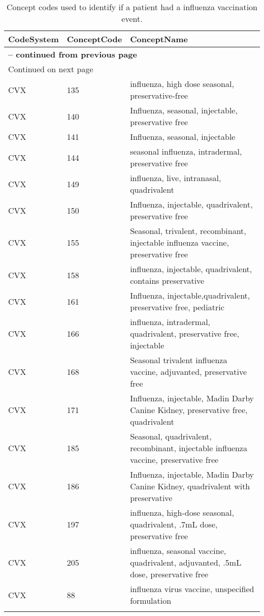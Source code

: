 \begin{longtable}{p{}p{}p{}}
\caption{Concept codes used to identify if a patient had a influenza vaccination event.} \\ 
 CodeSystem & ConceptCode & ConceptName \\ 
  \hline 
\endfirsthead 
\multicolumn{3}{p{\textwidth}}{{ \bfseries \tablename \thetable{} -- continued from previous page}} \ 
\hline CodeSystem & ConceptCode & ConceptName \\ \hline 
\endhead 
\hline \multicolumn{3}{p{\textwidth}}{{Continued on next page}} \\ \hline 
\endfoot 
\hline 
\endlastfoot 
 \hline
CVX & 135 & influenza, high dose seasonal, preservative-free \\ 
  CVX & 140 & Influenza, seasonal, injectable, preservative free \\ 
  CVX & 141 & Influenza, seasonal, injectable \\ 
  CVX & 144 & seasonal influenza, intradermal, preservative free \\ 
  CVX & 149 & influenza, live, intranasal, quadrivalent \\ 
  CVX & 150 & Influenza, injectable, quadrivalent, preservative free \\ 
  CVX & 155 & Seasonal, trivalent, recombinant, injectable influenza vaccine, preservative free \\ 
  CVX & 158 & influenza, injectable, quadrivalent, contains preservative \\ 
  CVX & 161 & Influenza, injectable,quadrivalent, preservative free, pediatric \\ 
  CVX & 166 & influenza, intradermal, quadrivalent, preservative free, injectable \\ 
  CVX & 168 & Seasonal trivalent influenza vaccine, adjuvanted, preservative free \\ 
  CVX & 171 & Influenza, injectable, Madin Darby Canine Kidney, preservative free, quadrivalent \\ 
  CVX & 185 & Seasonal, quadrivalent, recombinant, injectable influenza vaccine, preservative free \\ 
  CVX & 186 & Influenza, injectable, Madin Darby Canine Kidney, quadrivalent with preservative \\ 
  CVX & 197 & influenza, high-dose seasonal, quadrivalent, .7mL dose, preservative free \\ 
  CVX & 205 & influenza, seasonal vaccine, quadrivalent, adjuvanted, .5mL dose, preservative free \\ 
  CVX & 88 & influenza virus vaccine, unspecified formulation \\ 
  \hline
\label{tab:codes_flu_vaccine}
\end{longtable}
